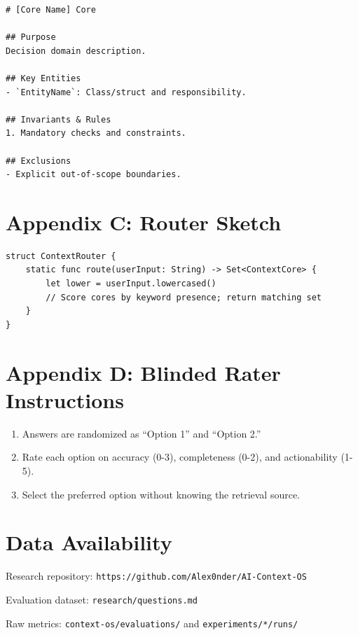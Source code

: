 \documentclass[11pt]{article}
\providecommand{\tightlist}{%
  \setlength{\itemsep}{2pt}%
  \setlength{\parskip}{0pt}%
}
\begin{document}
\begin{verbatim}
# [Core Name] Core

## Purpose
Decision domain description.

## Key Entities
- `EntityName`: Class/struct and responsibility.

## Invariants & Rules
1. Mandatory checks and constraints.

## Exclusions
- Explicit out-of-scope boundaries.
\end{verbatim}

\section{Appendix C: Router Sketch}\label{appendix-c-router-sketch}

\begin{verbatim}
struct ContextRouter {
    static func route(userInput: String) -> Set<ContextCore> {
        let lower = userInput.lowercased()
        // Score cores by keyword presence; return matching set
    }
}
\end{verbatim}

\section{Appendix D: Blinded Rater
Instructions}\label{appendix-d-blinded-rater-instructions}

\begin{enumerate}
\def\labelenumi{\arabic{enumi}.}
\tightlist
\item
  Answers are randomized as ``Option 1'' and ``Option 2.''
\item
  Rate each option on accuracy (0-3), completeness (0-2), and
  actionability (1-5).
\item
  Select the preferred option without knowing the retrieval source.
\end{enumerate}

\section{Data Availability}\label{data-availability}

Research repository: \texttt{https://github.com/Alex0nder/AI-Context-OS}

Evaluation dataset: \texttt{research/questions.md}

Raw metrics: \texttt{context-os/evaluations/} and
\texttt{experiments/*/runs/}
\end{document}
